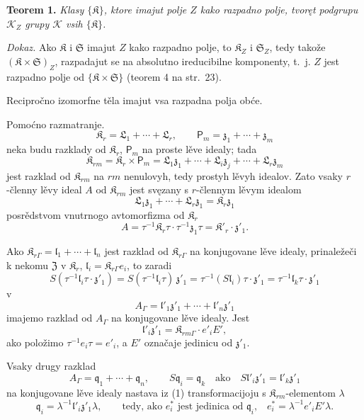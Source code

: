 \documentclass[11pt]{article}
\begin{document}
\textbf{Teorem 1.} \emph{Klasy \(\{\mathfrak K\}\), ktore imajut polje \(Z\) kako razpadno polje, tvoręt podgrupu \(\mathscr K_Z\) grupy \(\mathscr K\) vsih \(\{\mathfrak K\}\).}

\emph{Dokaz.} Ako \(\mathfrak K\) i \(\mathfrak S\) imajut \(Z\) kako razpadno polje, to \(\mathfrak K_Z\) i \(\mathfrak S_Z\), tedy takože \((\mathfrak K\times\mathfrak S)_Z\), razpadajut se na absolutno ireducibilne komponenty, t.~j. \(Z\) jest razpadno polje od \(\{\mathfrak K\times\mathfrak S\}\) (teorem 4 na str.~23).

Recipročno izomorfne těla imajut vsa razpadna polja obće.

Pomoćno razmatranje.
\[
\mathfrak K_r=\mathfrak L_1+\cdots+\mathfrak L_r,\qquad
\mathsf P_m=\mathfrak z_1+\cdots+\mathfrak z_m
\]
neka budu razklady od \(\mathfrak K_r\), \(\mathsf P_m\) na proste lěve idealy; tada
\[
\mathfrak K_{rm}=\mathfrak K_r\times\mathsf P_m
=\mathfrak L_1\mathfrak z_1+\cdots+\mathfrak L_i\mathfrak z_j+\cdots+\mathfrak L_r\mathfrak z_m
\]
jest razklad od \(\mathfrak K_{rm}\) na \(rm\) nenulovyh, tedy prostyh lěvyh idealov. Zato vsaky \(r\)-členny lěvy ideal \(A\) od \(\mathfrak K_{rm}\) jest svęzany s \(r\)-člennym lěvym idealom
\[
\mathfrak L_1\mathfrak z_1+\cdots+\mathfrak L_r\mathfrak z_1=\mathfrak K_r\mathfrak z_1
\]
posrědstvom vnutrnogo avtomorfizma od \(\mathfrak K_r\)
\[
A=\tau^{-1}\mathfrak K_r\tau\cdot\tau^{-1}\mathfrak z_1\tau
=\mathfrak K'_r\cdot\mathfrak z'_1.
\]

Ako \(\mathfrak K_{r\Gamma}=\mathfrak l_1+\cdots+\mathfrak l_n\) jest razklad od \(\mathfrak K_{r\Gamma}\) na konjugovane lěve idealy, prinaležeči k nekomu \(\mathfrak Z\) v \(\mathfrak K_r\), \(\mathfrak l_i=\mathfrak K_{r\Gamma}e_i\), to zaradi
\[
S(\tau^{-1}\mathfrak l_i\tau\cdot\mathfrak z'_1)
=S(\tau^{-1}\mathfrak l_i\tau)\,\mathfrak z'_1
=\tau^{-1}(S\mathfrak l_i)\tau\cdot\mathfrak z'_1
=\tau^{-1}\mathfrak l_k\tau\cdot\mathfrak z'_1
\]
v
\[
\tag{1}
A_\Gamma=\mathfrak l'_1\mathfrak z'_1+\cdots+\mathfrak l'_n\mathfrak z'_1
\]
imajemo razklad od \(A_\Gamma\) na konjugovane lěve idealy. Jest
\[
\mathfrak l'_i\mathfrak z'_1=\mathfrak K_{rm\Gamma}\cdot e'_iE',
\]
ako položimo \(\tau^{-1}e_i\tau=e'_i\), a \(E'\) označaje jedinicu od \(\mathfrak z'_1\).

Vsaky drugy razklad
\[
\tag{2}
A_\Gamma=\mathfrak q_1+\cdots+\mathfrak q_n,\qquad
S\mathfrak q_i=\mathfrak q_k\quad\text{ako}\quad
S\mathfrak l'_i\mathfrak z'_1=\mathfrak l'_k\mathfrak z'_1
\]
na konjugovane lěve idealy nastava iz (1) transformacijoju s \(\mathfrak K_{rm}\)-elementom \(\lambda\)
\[
\mathfrak q_i=\lambda^{-1}\mathfrak l'_i\mathfrak z'_1\lambda,
\qquad
\text{tedy, ako \(e_i^*\) jest jedinica od \(\mathfrak q_i\),}\quad
e_i^*=\lambda^{-1}e'_iE'\lambda.
\]
\end{document}

